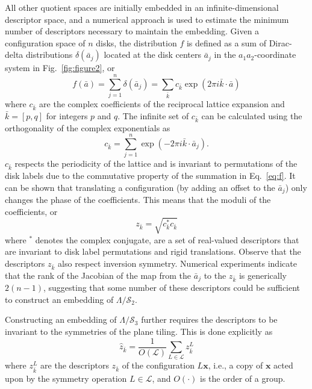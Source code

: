 \documentclass[default,iicol]{sn-jnl}%
\theoremstyle{thmstyleone}%
\theoremstyle{thmstyletwo}%
\theoremstyle{thmstylethree}%
\renewcommand{\vec}[1]{\bar{#1}}
\providecommand{\config}[1]{\mathbf{#1}}
\providecommand{\rmi}{i}
\begin{document}
All other quotient spaces are initially embedded in an infinite-dimensional descriptor space, and a numerical approach is used to estimate the minimum number of descriptors necessary to maintain the embedding. Given a configuration space of $n$ disks, the distribution $f$ is defined as a sum of Dirac-delta distributions $\delta(\vec{a}_j)$ located at the disk centers $\vec{a}_j$ in the $a_1a_2$-coordinate system in Fig.\ \ref{fig:figure2}, or
\begin{equation}
f(\vec{a}) = \sum_{j = 1}^{n} \delta(\vec{a}_j) = \sum_{\vec{k}} {c_{\vec{k}} \exp{(2\pi \rmi \vec{k} \cdot \vec{a})}}
\label{eq:f}
\end{equation}
where $c_{\vec{k}}$ are the complex coefficients of the reciprocal lattice expansion and $\vec{k} = [p, q]$ for integers $p$ and $q$. The infinite set of $c_{\vec{k}}$ can be calculated using the orthogonality of the complex exponentials as
\begin{equation}
c_{\vec{k}} = \sum_{j=1}^{n} \exp{(-2\pi \rmi \vec{k} \cdot \vec{a}_j)} .
\label{eq:c_k}
\end{equation}
$c_{\vec{k}}$ respects the periodicity of the lattice and is invariant to permutations of the disk labels due to the commutative property of the summation in Eq.\ \ref{eq:f}. It can be shown that translating a configuration (by adding an offset to the $\vec{a}_j$) only changes the phase of the coefficients. This means that the moduli of the coefficients, or
\begin{equation}
z_{\vec{k}} = \sqrt{c^\ast_{\vec{k}} c_{\vec{k}}}
\label{eq:z_k}
\end{equation}
where $^\ast$ denotes the complex conjugate, are a set of real-valued descriptors that are invariant to disk label permutations and rigid translations. Observe that the descriptors $z_{\vec{k}}$ also respect inversion symmetry. Numerical experiments indicate that the rank of the Jacobian of the map from the $\vec{a}_j$ to the $z_{\vec{k}}$ is generically $2(n - 1)$, suggesting that some number of these descriptors could be sufficient to construct an embedding of $\Lambda / \mathcal{S}_2$.

Constructing an embedding of $\Lambda / \mathcal{S}_3$ further requires the descriptors to be invariant to the symmetries of the plane tiling. This is done explicitly as
\begin{equation}
\hat{z}_{\vec{k}} = \frac{1}{O(\mathcal{L})}\sum_{L \in \mathcal{L}} z_{\vec{k}}^{L}
\label{eq:z_hat_k}
\end{equation}
where $z_{\vec{k}}^{L}$ are the descriptors $z_{\vec{k}}$ of the configuration $L \config{x}$, i.e., a copy of $\config{x}$ acted upon by the symmetry operation $L \in \mathcal{L}$, and $O(\cdot)$ is the order of a group.
\end{document}
